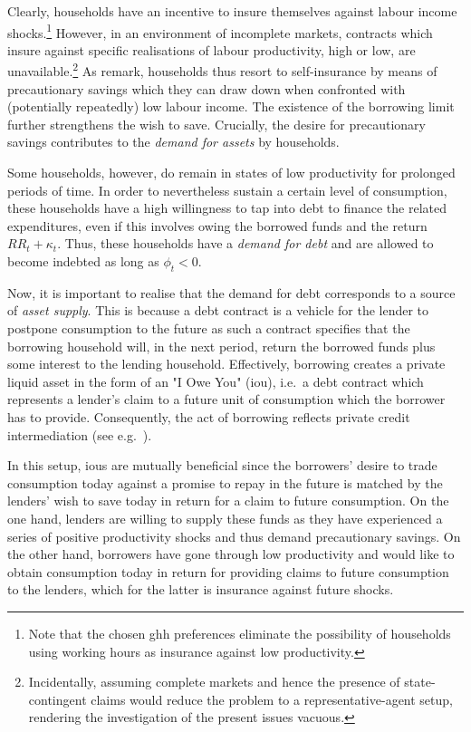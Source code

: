 \documentclass[12pt]{article} %
\numberwithin{equation}{section} %
\begin{document}
Clearly, households have an incentive to insure themselves against labour income shocks.\footnote{Note that the chosen \Gls{ghh} preferences eliminate the possibility of households using working hours as insurance against low productivity.} However, in an environment of incomplete markets, contracts which insure against specific realisations of labour productivity, high or low, are unavailable.\footnote{Incidentally, assuming complete markets and hence the presence of state-contingent claims would reduce the problem to a representative-agent setup, rendering the investigation of the present issues vacuous.} As \textcite{heath2009} remark, households thus resort to self-insurance by means of precautionary savings which they can draw down when confronted with (potentially repeatedly) low labour income. The existence of the borrowing limit further strengthens the wish to save. Crucially, the desire for precautionary savings contributes to the \textit{demand for assets} by households. %

Some households, however, do remain in states of low productivity for prolonged periods of time. In order to nevertheless sustain a certain level of consumption, these households have a high willingness to tap into debt to finance the related expenditures, even if this involves owing the borrowed funds and the return $RR_t + \kappa_t$. Thus, these households have a \textit{demand for debt} and are allowed to become indebted as long as $\phi_t < 0$.

Now, it is important to realise that the demand for debt corresponds to a source of \textit{asset supply}. This is because a debt contract is a vehicle for the lender to postpone consumption to the future as such a contract specifies that the borrowing household will, in the next period, return the borrowed funds plus some interest to the lending household. Effectively, borrowing creates a private liquid asset in the form of an "I Owe You" (\Gls{iou}), i.e.~a debt contract which represents a lender's claim to a future unit of consumption which the borrower has to provide. Consequently, the act of borrowing reflects private credit intermediation (see e.g.~\cite{bayer2023}).

In this setup, \Gls{iou}s are mutually beneficial since the borrowers' desire to trade consumption today against a promise to repay in the future is matched by the lenders' wish to save today in return for a claim to future consumption. On the one hand, lenders are willing to supply these funds as they have experienced a series of positive productivity shocks and thus demand precautionary savings. On the other hand, borrowers have gone through low productivity and would like to obtain consumption today in return for providing claims to future consumption to the lenders, which for the latter is insurance against future shocks.
\end{document}
